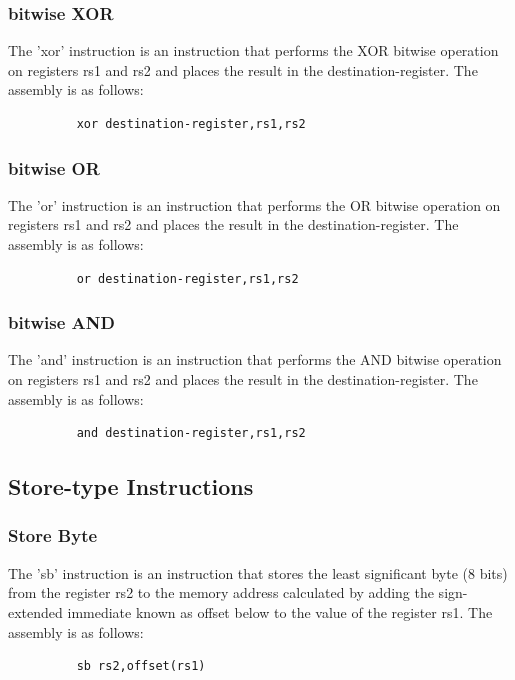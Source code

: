 \documentclass{article}
\begin{document}
\subsubsection{bitwise XOR}
\qquad
The 'xor' instruction is an instruction that performs the XOR bitwise operation on registers rs1 and rs2 and places the result in the destination-register. The assembly is as follows:
\begin{figure}[!htbp]
    \centering
    \begin{verbatim}
    xor destination-register,rs1,rs2
    \end{verbatim}
\end{figure}\newline

\subsubsection{bitwise OR}
\qquad
The 'or' instruction is an instruction that performs the OR bitwise operation on registers rs1 and rs2 and places the result in the destination-register. The assembly is as follows:
\begin{figure}[!htbp]
    \centering
    \begin{verbatim}
    or destination-register,rs1,rs2
    \end{verbatim}
\end{figure}\newline

\subsubsection{bitwise AND}
\qquad
The 'and' instruction is an instruction that performs the AND bitwise operation on registers rs1 and rs2 and places the result in the destination-register. The assembly is as follows:
\begin{figure}[!htbp]
    \centering
    \begin{verbatim}
    and destination-register,rs1,rs2
    \end{verbatim}
\end{figure}\newline


\subsection{Store-type Instructions}

\subsubsection{Store Byte}
\qquad
The 'sb' instruction is an instruction that stores the least significant byte (8 bits) from the register rs2 to the memory address calculated by adding the sign-extended immediate known as offset below to the value of the register rs1. The assembly is as follows:
\begin{figure}[!htbp]
    \centering
    \begin{verbatim}
    sb rs2,offset(rs1)
    \end{verbatim}
\end{figure}\newline
\end{document}
